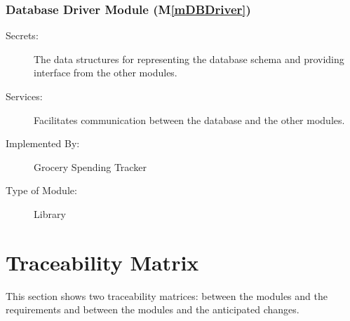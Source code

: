 \documentclass[12pt, titlepage]{article}
\newcommand{\mref}[1]{M\ref{#1}}
\begin{document}
\subsubsection{Database Driver Module (\mref{mDBDriver})}

\begin{description}
\item[Secrets:] The data structures for representing the database schema and providing interface from the other modules.
\item[Services:] Facilitates communication between the database and the other modules.
\item[Implemented By:] Grocery Spending Tracker
\item[Type of Module:] Library
\end{description}

\section{Traceability Matrix} \label{SecTM}

This section shows two traceability matrices: between the modules and the
requirements and between the modules and the anticipated changes.
\end{document}
